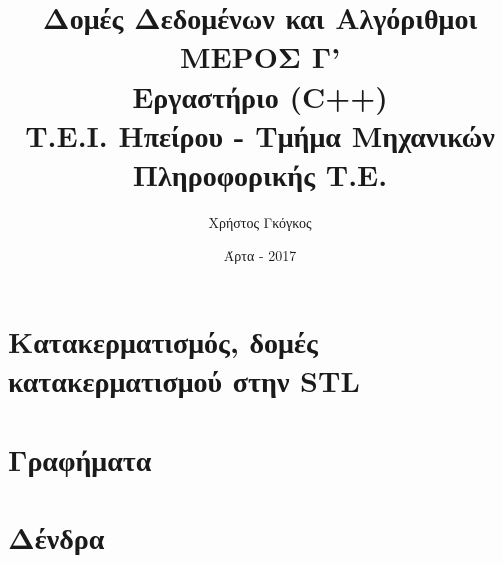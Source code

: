 \documentclass[11pt,a4paper]{book}
\title{Δομές Δεδομένων και Αλγόριθμοι \\ ΜΕΡΟΣ Γ' \\ Εργαστήριο (C++)\\ Τ.Ε.Ι. Ηπείρου - Τμήμα Μηχανικών Πληροφορικής Τ.Ε.}
\author{Χρήστος Γκόγκος }
\date{Άρτα - 2017}
\begin{document}
\maketitle
\mainmatter

\setcounter{chapter}{6} 
\chapter{Κατακερματισμός, δομές κατακερματισμού στην STL}


\chapter{Γραφήματα}


\chapter{Δένδρα}

\end{document}
